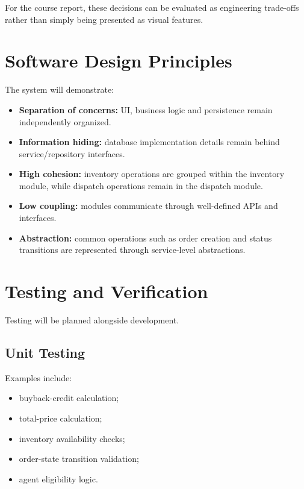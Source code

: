 \documentclass[11pt,a4paper]{article}
\begin{document}
For the course report, these decisions can be evaluated as engineering
trade-offs rather than simply being presented as visual features.

\section{Software Design Principles}

The system will demonstrate:

\begin{itemize}[leftmargin=0.7cm]
    \item \textbf{Separation of concerns:} UI, business logic and persistence
    remain independently organized.
    \item \textbf{Information hiding:} database implementation details remain
    behind service/repository interfaces.
    \item \textbf{High cohesion:} inventory operations are grouped within the
    inventory module, while dispatch operations remain in the dispatch module.
    \item \textbf{Low coupling:} modules communicate through well-defined APIs
    and interfaces.
    \item \textbf{Abstraction:} common operations such as order creation and
    status transitions are represented through service-level abstractions.
\end{itemize}

\section{Testing and Verification}

Testing will be planned alongside development.

\subsection{Unit Testing}

Examples include:

\begin{itemize}[leftmargin=0.7cm]
    \item buyback-credit calculation;
    \item total-price calculation;
    \item inventory availability checks;
    \item order-state transition validation;
    \item agent eligibility logic.
\end{itemize}
\end{document}

